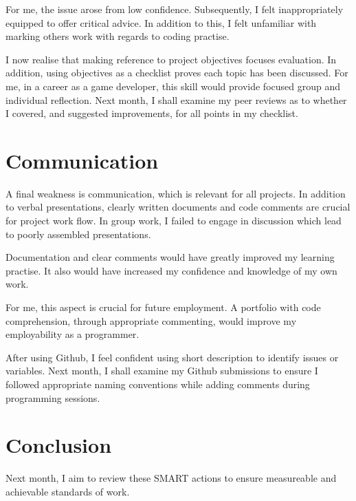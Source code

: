 \documentclass{scrartcl}
\begin{document}
For me, the issue arose from low confidence. Subsequently, I felt inappropriately equipped to offer critical advice. In addition to this, I felt unfamiliar with marking others work with regards to coding practise.

I now realise that making reference to project objectives focuses evaluation. In addition, using objectives as a checklist proves each topic has been discussed. For me, in a career as a game developer, this skill would provide focused group and individual reflection. Next month, I shall examine my peer reviews as to whether I covered, and suggested improvements, for all points in my checklist.

\section{Communication}

A final weakness is communication, which is relevant for all projects. In addition to verbal presentations, clearly written documents and code comments are crucial for project work flow. In group work, I failed to engage in discussion which lead to poorly assembled presentations.

Documentation and clear comments would have greatly improved my learning practise. It also would have increased my confidence and knowledge of my own work.

For me, this aspect is crucial for future employment. A portfolio with code comprehension, through appropriate commenting, would improve my employability as a programmer.

After using Github, I feel confident using short description to identify issues or variables. Next month, I shall examine my Github submissions to ensure I followed appropriate naming conventions while adding comments during programming sessions.

\section{Conclusion}

Next month, I aim to review these SMART actions to ensure measureable and achievable standards of work.

%
%
\end{document}
